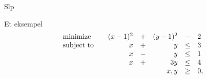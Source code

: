 \documentclass{beamer}
\begin{document}
\begin{frame}{Slp}

\end{frame}



\begin{frame}{Et eksempel}
\[
\begin{array}{lcrcrcl}
\textrm{minimize}           & &   (x-1)^2 &+&   (y-1)^2 & - &  2 \\
\textrm{subject to}         & &         x &+&         y &\leq& 3 \\
                            & &         x &-&         y &\leq& 1 \\
                            & &         x &+&       3 y &\leq& 4 \\
                 \multicolumn{5}{r}{x,y}                &\geq& 0,
\end{array}
\]
\end{frame}
\end{document}
